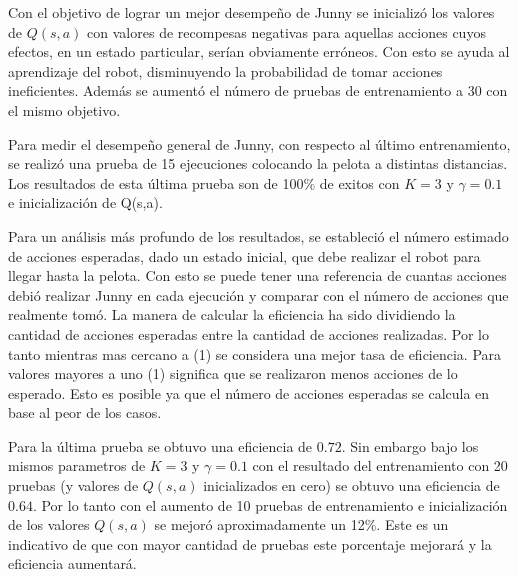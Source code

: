 Con el objetivo de lograr un mejor desempeño de Junny se inicializ\'o los valores de $Q(s,a)$ con valores de recompesas negativas para aquellas acciones cuyos efectos, en un estado particular, serían obviamente err\'oneos. Con esto se ayuda al aprendizaje del robot, disminuyendo la probabilidad de tomar acciones ineficientes. Adem\'as se aumentó el n\'umero de pruebas de entrenamiento a 30 con el mismo objetivo.

Para medir el desempeño general de Junny, con respecto al último entrenamiento, se realizó una prueba de 15 ejecuciones colocando la pelota a distintas distancias. Los resultados de esta \'ultima prueba  son de 100\% de exitos con  $K = 3$ y $ \gamma = 0.1 $ e inicializaci\'on de Q(s,a). %
%

Para un análisis más profundo de los resultados, se estableci\'o el n\'umero estimado de acciones esperadas, dado un estado inicial, que debe realizar el robot para llegar hasta la pelota. Con esto se puede tener una referencia de cuantas acciones debió realizar Junny en cada ejecución y comparar con el número de acciones que realmente tomó. La manera de calcular la eficiencia ha sido dividiendo la cantidad de acciones esperadas entre la cantidad de acciones realizadas. Por lo tanto mientras mas cercano a (1) se considera una mejor tasa de eficiencia. Para valores mayores a uno (1) significa que se realizaron menos acciones de lo esperado. Esto es posible ya que el número de acciones esperadas se calcula en base al peor de los casos.  

Para la última prueba se obtuvo una eficiencia de $0.72$. Sin embargo bajo los mismos parametros de $K = 3$ y $ \gamma = 0.1 $ con el resultado del entrenamiento con 20 pruebas (y valores de $Q(s,a)$ inicializados en cero) se obtuvo una eficiencia de $0.64$. Por lo tanto con el aumento de 10 pruebas de entrenamiento e inicialización de los valores $Q(s,a)$ se mejoró aproximadamente un 12\%. Este es un indicativo de que con mayor cantidad de pruebas este porcentaje mejorar\'a y la eficiencia aumentará.

